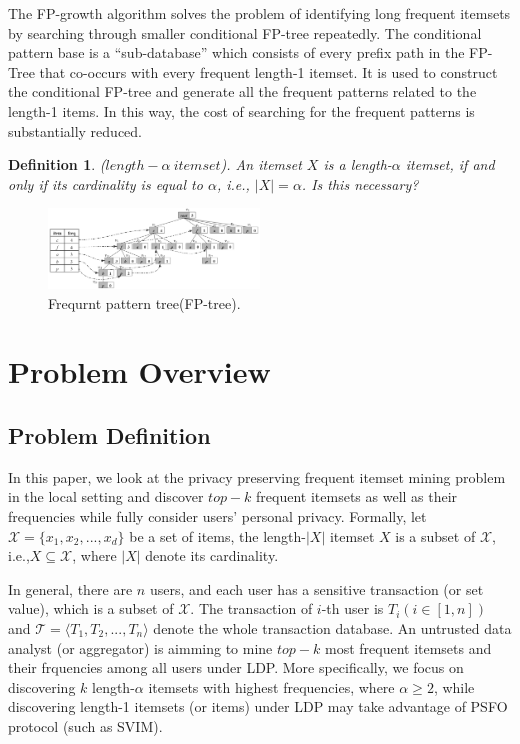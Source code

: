 \documentclass[conference]{IEEEtran}
\newtheorem{Definition}{\bf Definition}
\begin{document}
The FP-growth algorithm solves the problem of identifying long frequent itemsets by searching through smaller conditional FP-tree repeatedly. The conditional pattern base is a “sub-database” which consists of every prefix path in the FP-Tree that co-occurs with every frequent length-1 itemset. It is used to construct the conditional FP-tree and generate all the frequent patterns related to the length-1 items. In this way, the cost of searching for the frequent patterns is substantially reduced.

\begin{Definition}
($length-\alpha \ itemset$). An itemset $X$ is a length-$\alpha$ itemset, if and only if its cardinality is equal to $\alpha$, i.e., $|X| = \alpha$. {\color{red} Is this necessary? }
\end{Definition}

\begin{figure}[htbp]
\centerline{\includegraphics[width=0.5\textwidth]{tree.png}}
\caption{Frequrnt pattern tree(FP-tree).}
\label{fptree}
\end{figure}

\section{Problem Overview }

\subsection{Problem Definition}
In this paper, we look at the privacy preserving frequent itemset mining problem in the local setting and discover $top-k$ frequent itemsets as well as their frequencies while fully consider users' personal privacy. Formally, let $\mathcal{X} = \{x_1,x_2,...,x_d\}$ be a set of items, the length-$|X|$ itemset $X$ is a subset of $\mathcal{X}$, i.e.,$X \subseteq \mathcal{X}$, where $|X|$ denote its cardinality.

In general, there are $n$ users, and each user has a sensitive transaction (or set value), which is a subset of $\mathcal{X}$. The transaction of $i$-th user is $T_i(i \in [1,n])$ and $\mathcal{T} = \langle T_1,T_2,...,T_n \rangle$ denote the whole transaction database. An untrusted data analyst (or aggregator) is aimming to mine $top-k$ most frequent itemsets and their frquencies among all users under LDP. More specifically, we focus on discovering $k$ length-$\alpha$ itemsets with highest frequencies, where $\alpha \geq 2$, while discovering length-1 itemsets (or items) under LDP may take advantage of PSFO protocol (such as SVIM).
\end{document}
